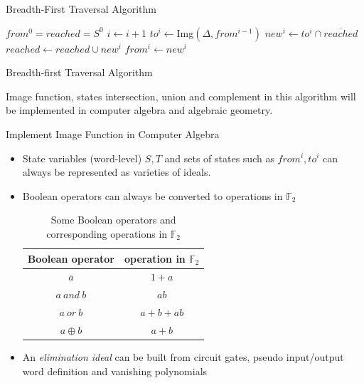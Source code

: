 \documentclass[xcolor=dvipsnames]{beamer}
\begin{document}
\begin{frame}{\large{Breadth-First Traversal Algorithm}}
\begin{algorithm}[H]
\SetAlgoNoLine
  $from^0 = reached = S^0$\;
  {
  	$i \gets i + 1$\;
	$to^i \gets$Img$(\Delta, from^{i-1})$\;
	$new^i \gets to^i \cap \overline{reached}$\;
  	$reached \gets reached \cup new^i$\;
	$from^i \gets new^i$\;
  }
\caption {Breadth-first Traversal Algorithm}\label{alg:BFS}
\end{algorithm}
\vspace{5mm}
Image function, states intersection, union and complement in this algorithm
will be implemented in computer algebra and algebraic geometry.
\end{frame}

\begin{frame}{\large{Implement Image Function in Computer Algebra}}
\begin{itemize}
\item State variables (word-level) $S, T$ and sets of states such as
$from^i, to^i$ can always be represented as varieties of ideals.
\item Boolean operators can always be converted to operations in $\mathbb F_2$
\begin{table}
\centering
\begin{tabular}{|c|c|} \hline
Boolean operator & operation in $\mathbb{F}_{2}$\\ \hline
$\overline{a}$ & $1 + a$\\ \hline
$a\ and\ b$ & $ab$\\ \hline
$a\ or\ b$ & $a + b + ab$\\ \hline
$a \oplus b$ & $a + b$\\
\hline\end{tabular}
\caption{Some Boolean operators and corresponding operations in $\mathbb{F}_{2}$}
\label{table:booltogalois_op}
\end{table}
\item An \emph{elimination ideal} can be built from circuit gates, pseudo input/output
word definition and vanishing polynomials
\end{itemize}
\end{frame}
\end{document}

